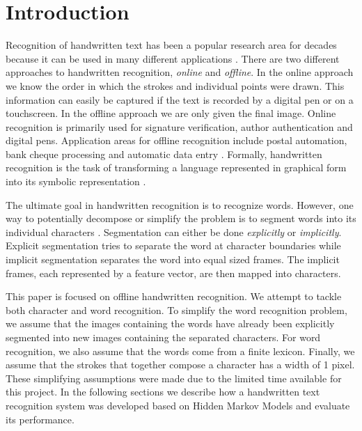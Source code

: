 \section{Introduction}

Recognition of handwritten text has been a popular research area for decades because it can be used in many different applications  \cite{intro1}. %
There are two different approaches to handwritten recognition, \textit{online} and \textit{offline}.
In the online approach we know the order in which the strokes and individual points were drawn.
This information can easily be captured if the text is recorded by a digital pen or on a touchscreen.
In the offline approach we are only given the final image.
Online recognition is primarily used for signature verification, author authentication and digital pens.
Application areas for offline recognition include postal automation, bank cheque processing and automatic data entry \cite{intro1}.
Formally, handwritten recognition is the task of transforming a language represented in graphical form into its symbolic representation \cite{introsurvey}.

The ultimate goal in handwritten recognition is to recognize words.
However, one way to potentially decompose or simplify the problem is to segment words into its individual characters \cite{intro-Yacoubi}. 
Segmentation can either be done \textit{explicitly} or \textit{implicitly}.
Explicit segmentation tries to separate the word at character boundaries while implicit segmentation separates the word into equal sized frames.
The implicit frames, each represented by a feature vector, are then mapped into characters.

This paper is focused on offline handwritten recognition.
We attempt to tackle both character and word recognition.
To simplify the word recognition problem, we assume that the images containing the words have already been explicitly segmented into new images containing the separated characters.
For word recognition, we also assume that the words come from a finite lexicon.
Finally, we assume that the strokes that together compose a character has a width of 1 pixel.
These simplifying assumptions were made due to the limited time available for this project.
In the following sections we describe how a handwritten text recognition system was developed based on Hidden Markov Models and evaluate its performance.

